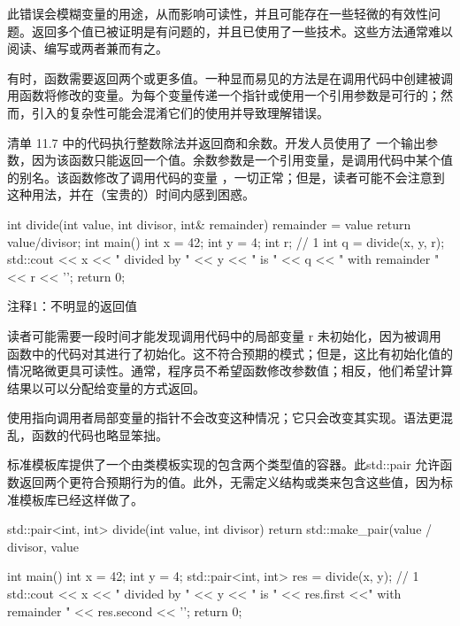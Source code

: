 此错误会模糊变量的用途，从而影响可读性，并且可能存在一些轻微的有效性问题。返回多个值已被证明是有问题的，并且已使用了一些技术。这些方法通常难以阅读、编写或两者兼而有之。


有时，函数需要返回两个或更多值。一种显而易见的方法是在调用代码中创建被调用函数将修改的变量。为每个变量传递一个指针或使用一个引用参数是可行的；然而，引入的复杂性可能会混淆它们的使用并导致理解错误。

清单 11.7 中的代码执行整数除法并返回商和余数。开发人员使用了 一个输出参数，因为该函数只能返回一个值。余数参数是一个引用变量，是调用代码中某个值的别名。该函数修改了调用代码的变量 ，一切正常；但是，读者可能不会注意到这种用法，并在（宝贵的）时间内感到困惑。


\begin{cpp}
int divide(int value, int divisor, int& remainder) {
  remainder = value %
  return value/divisor;
}
int main() {
  int x = 42;
  int y = 4;
  int r; // 1
  int q = divide(x, y, r);
  std::cout << x << " divided by " << y << " is " << q
    << " with remainder " << r << '\n';
  return 0;
}
\end{cpp}


{\footnotesize
注释1：不明显的返回值
}


读者可能需要一段时间才能发现调用代码中的局部变量 r 未初始化，因为被调用函数中的代码对其进行了初始化。这不符合预期的模式；但是，这比有初始化值的情况略微更具可读性。通常，程序员不希望函数修改参数值；相反，他们希望计算结果以可以分配给变量的方式返回。

使用指向调用者局部变量的指针不会改变这种情况；它只会改变其实现。语法更混乱，函数的代码也略显笨拙。


标准模板库提供了一个由类模板实现的包含两个类型值的容器。此std::pair 允许函数返回两个更符合预期行为的值。此外，无需定义结构或类来包含这些值，因为标准模板库已经这样做了。


\begin{cpp}
std::pair<int, int> divide(int value, int divisor) {
  return std::make_pair(value / divisor, value %
}

int main() {
  int x = 42;
  int y = 4;
  std::pair<int, int> res = divide(x, y); // 1
  std::cout << x << " divided by " << y << " is " << res.first
    <<" with remainder " << res.second << '\n';
  return 0;
}
\end{cpp}

